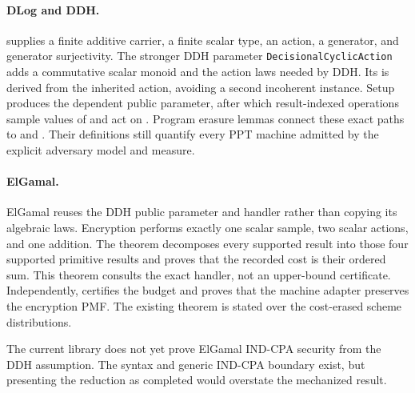 \paragraph{DLog and DDH.}
 supplies a finite additive carrier, a finite scalar type,
an action, a generator, and generator surjectivity.  The stronger DDH parameter
\texttt{DecisionalCyclicAction} adds a commutative scalar monoid and the action
laws needed by DDH.  Its  is derived from the inherited action,
avoiding a second incoherent instance.  Setup produces the dependent public
parameter, after which result-indexed operations sample values of
 and act on .  Program erasure lemmas connect
these exact paths to  and .  Their
 definitions still quantify every PPT machine admitted by the
explicit adversary model and measure.

\paragraph{ElGamal.}
ElGamal reuses the DDH public parameter and handler rather than copying its
algebraic laws.  Encryption performs exactly one scalar sample, two scalar
actions, and one addition.  The theorem 
decomposes every supported result into those four supported primitive results
and proves that the recorded cost is their ordered sum.  This theorem consults
the exact handler, not an upper-bound certificate.  Independently,
 certifies the budget and
 proves that the machine adapter preserves
the encryption PMF.  The existing  theorem is stated over the
cost-erased scheme distributions.

The current library does not yet prove ElGamal IND-CPA security from the DDH
assumption.  The syntax and generic IND-CPA boundary exist, but presenting the
reduction as completed would overstate the mechanized result.
